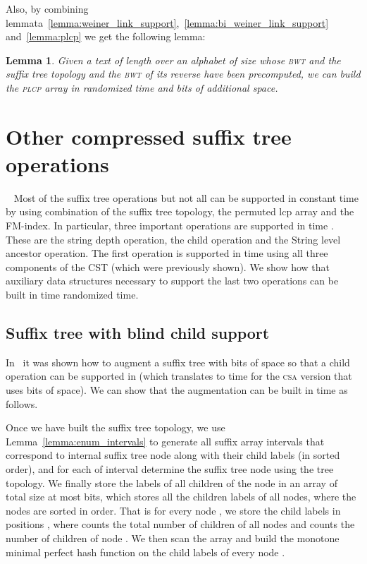 \documentclass[a4paper]{article}
\newtheorem{lemma}{Lemma}
\begin{document}
\begin{enumerate}
Also, by combining lemmata~\ref{lemma:weiner_link_support},~\ref{lemma:bi_weiner_link_support} and~\ref{lemma:plcp} 
we get the following lemma:
\begin{lemma}
\label{lemma:plcp2}
Given a text of length  over an alphabet of size  
whose \textsc{bwt} and the suffix tree topology 
and the \textsc{bwt} of its reverse have been precomputed,
we can build the \textsc{plcp} array in randomized 
 time and  bits of 
additional space. 
\end{lemma}
\section{Other compressed suffix tree operations}
~\label{sec:build_cst}
Most of the suffix tree operations but not all can be supported in constant time by using combination of the suffix tree topology, the permuted lcp array and the FM-index. In particular, three important operations are supported in time . These are the string depth operation, the child operation and the String level ancestor operation. The first operation is supported in time  using all three components of the CST (which were previously shown). We show how that auxiliary data structures necessary to support the last two operations can be built in time randomized  time. 

\subsection{Suffix tree with blind child support}
\label{sec:build_blind_child_support}
In~\cite{BN11,BNtalg14} it was shown how to augment a suffix tree with 
bits of space so that a child operation can be supported in  (which translates 
to  time for the \textsc{csa} version that uses  bits of space). 
We can show that the augmentation can be built in  time as follows. 

Once we have built the suffix tree topology, we use Lemma~\ref{lemma:enum_intervals} to 
generate all suffix array intervals that correspond to internal suffix tree node along with
their child labels (in sorted order), and for each of interval
determine the suffix tree node using the tree topology. 
We finally store the labels of all children of the node 
in an  array of total size at most  bits, which stores all the children labels
of all nodes, where the nodes are sorted in order. That is for every node , we store 
the child labels in positions , where  counts the total number of children of all 
nodes  and  counts the number of children of node . We then scan the array  and 
build the monotone minimal perfect hash function on the child labels of every node . 


\end{enumerate}
\end{document}
